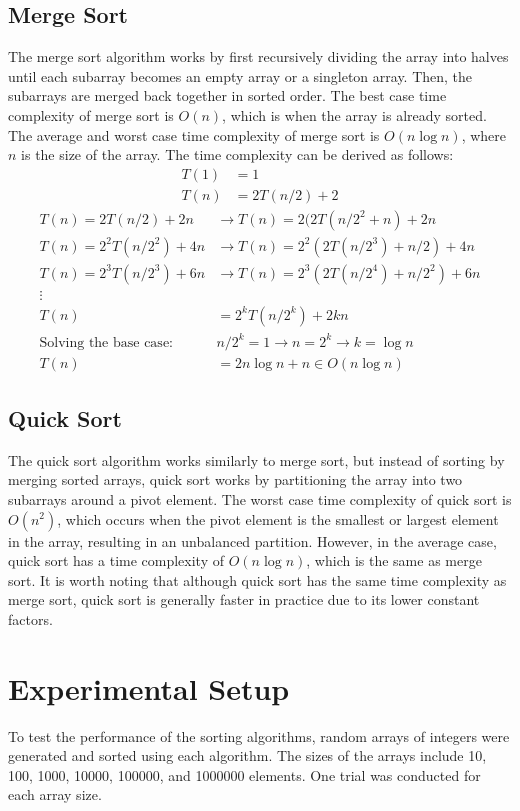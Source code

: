 \documentclass{article}
\begin{document}
\subsection{Merge Sort}
The merge sort algorithm works by first recursively dividing the array into halves until each subarray becomes an empty array or a singleton array.
Then, the subarrays are merged back together in sorted order.
The best case time complexity of merge sort is $O(n)$, which is when the array is already sorted.
The average and worst case time complexity of merge sort is $O(n \log n)$, where $n$ is the size of the array.
The time complexity can be derived as follows:
\begin{align*}
    T(1) &= 1 \\
    T(n) &= 2T(n/2) + 2
\end{align*}
\begin{align}
    T(n) = 2T(n/2) + 2n &\longrightarrow T(n) = 2(2T(n/2^2 + n) + 2n \\
    T(n) = 2^2T(n/2^2) + 4n &\longrightarrow T(n) = 2^2(2T(n/2^3) + n/2) + 4n \\
    T(n) = 2^3T(n/2^3) + 6n &\longrightarrow T(n) = 2^3(2T(n/2^4) + n/2^2) + 6n \\
    \vdots \nonumber \\
    T(n) &= 2^kT(n/2^k) + 2kn \nonumber \\
    \text{Solving the base case: }& n/2^k = 1 \rightarrow n = 2^k \rightarrow k = \log n \nonumber \\
    T(n) &= 2n \log{n} + n \in O(n \log n) \nonumber
\end{align}

\subsection{Quick Sort}
The quick sort algorithm works similarly to merge sort, but instead of sorting by merging sorted arrays, quick sort works by partitioning the array into two subarrays around a pivot element.
The worst case time complexity of quick sort is $O(n^2)$, which occurs when the pivot element is the smallest or largest element in the array, resulting in an unbalanced partition.
However, in the average case, quick sort has a time complexity of $O(n \log n)$, which is the same as merge sort.
It is worth noting that although quick sort has the same time complexity as merge sort, quick sort is generally faster in practice due to its lower constant factors.

\section{Experimental Setup}
To test the performance of the sorting algorithms, random arrays of integers were generated and sorted using each algorithm.
The sizes of the arrays include 10, 100, 1000, 10000, 100000, and 1000000 elements.
One trial was conducted for each array size.
\end{document}
